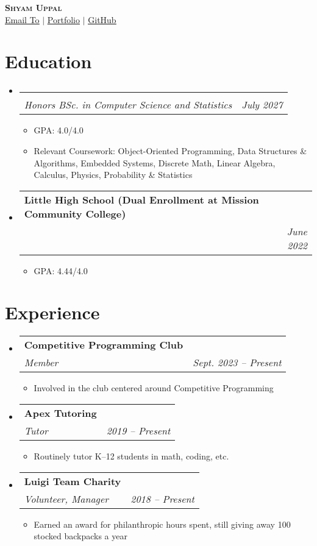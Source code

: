 \documentclass[letterpaper,11pt]{article}
\makeatletter
\newcommand{\resumeItem}[1]{
  \item\small{
    {#1 \vspace{-2pt}}
  }
}
\newcommand{\resumeSubheading}[4]{
  \vspace{-2pt}\item
    \begin{tabular*}{0.97\textwidth}[t]{l@{\extracolsep{\fill}}r}
      \textbf{#1} & #2 \\
      \textit{\small#3} & \textit{\small #4} \\
    \end{tabular*}\vspace{-7pt}
}
\newcommand{\resumeSubHeadingListStart}{\begin{itemize}[leftmargin=0.15in, label={}]}
\newcommand{\resumeSubHeadingListEnd}{\end{itemize}}
\newcommand{\resumeItemListStart}{\begin{itemize}}
\newcommand{\resumeItemListEnd}{\end{itemize}\vspace{-5pt}}
\makeatother
\begin{document}
\begin{center}
    \textbf{\Huge \scshape Shyam Uppal} \\ \vspace{1pt}
    \small \href{mailto: shyam.uppal@mail.utoronto.ca}{\underline{Email To}} $|$
    \href{}{\underline{Portfolio}} $|$
    \href{}{\underline{GitHub}}
\end{center}


\section{Education}
  \resumeSubHeadingListStart
    \resumeSubheading
      {}{}
      {Honors BSc. in Computer Science and Statistics}{July 2027}
      \resumeItemListStart
        \resumeItem{GPA: 4.0/4.0}
        \resumeItem{Relevant Coursework: Object-Oriented Programming, Data Structures \& Algorithms, Embedded Systems, Discrete Math, Linear Algebra, Calculus, Physics, Probability \& Statistics}
      \resumeItemListEnd
    \resumeSubheading
      {Little High School (Dual Enrollment at Mission Community College)}{ }
      {}{June 2022}
      \resumeItemListStart
        \resumeItem{GPA: 4.44/4.0}
      \resumeItemListEnd
  \resumeSubHeadingListEnd


\section{Experience}
  \resumeSubHeadingListStart
    \resumeSubheading
      {Competitive Programming Club}{ }
      {Member}{Sept. 2023 -- Present}
      \resumeItemListStart
        \resumeItem{Involved in the club centered around Competitive Programming}
      \resumeItemListEnd
    \resumeSubheading
      {Apex Tutoring}{ }
      {Tutor}{2019 -- Present}
      \resumeItemListStart
        \resumeItem{Routinely tutor K--12 students in math, coding, etc.}
      \resumeItemListEnd
    \resumeSubheading
      {Luigi Team Charity}{ }
      {Volunteer, Manager}{2018 -- Present}
      \resumeItemListStart
        \resumeItem{Earned an award for philanthropic hours spent, still giving away 100 stocked backpacks a year}
      \resumeItemListEnd
  \resumeSubHeadingListEnd


\end{document}
